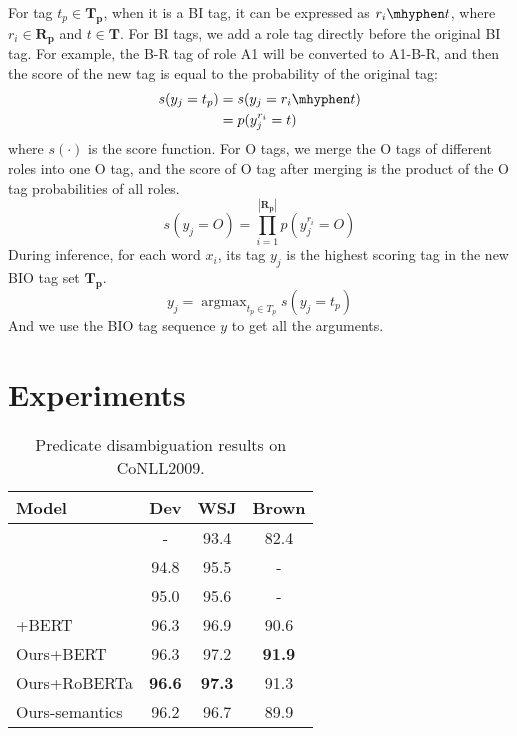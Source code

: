 \documentclass[11pt]{article}
\begin{document}
For tag $t_p \in \bm{T_p}$, when it is a BI tag, it can be expressed as $r_i\mhyphen t$, where $r_i \in \bm{R_p}$ and $t \in \bm{T}$. For BI tags, we add a role tag directly before the original BI tag. For example, the B-R tag of role A1 will be converted to A1-B-R, and then the score of the new tag is equal to the probability of the original tag:
\begin{equation}
\begin{aligned}
    s(y_j=t_p)&=s(y_j=r_i\mhyphen t) \\
    &=p(y^{r_i}_j=t)
\end{aligned}   
\end{equation}
where $s(\cdot)$ is the score function. For O tags, we merge the O tags of different roles into one O tag, and the score of O tag after merging is the product of the O tag probabilities of all roles. 
\begin{equation}
 s(y_j=O)= \prod_{i=1}^{|\bm{R_p}|} p(y^{r_i}_j=O)    
\end{equation}
During inference, for each word $x_i$, its tag $y_j$ is the highest scoring tag in the new BIO tag set $\bm{T_p}$.
\begin{equation}
y_j = \mathop{\arg\max}_{t_p \in T_p} s(y_j=t_p) 
\end{equation}
And we use the BIO tag sequence $y$ to get all the arguments.
\section{Experiments}
\begin{table}
\centering
\small 
\begin{tabular}{lccc} 
\toprule
Model                    & Dev   & WSJ   & Brown  \\ 
\midrule
\citet{shi2017joint} & -     & 93.4 & 82.4  \\
\citet{roth-lapata-2016-neural}     & 94.8 & 95.5 & -      \\
\citet{he-etal-2018-syntax} & 95.0 & 95.6 & -      \\
\citet{shi2019simple}{\scriptsize+BERT} & 96.3 & 96.9 & 90.6  \\ 
\midrule
Ours{\scriptsize+BERT}   &   96.3  &  97.2  & \textbf{91.9} \\
Ours{\scriptsize+RoBERTa}  & \textbf{96.6} & \textbf{97.3} & 91.3 \\
Ours{\scriptsize -semantics} &  96.2  & 96.7 & 89.9 \\
\bottomrule
\end{tabular}
\caption{Predicate disambiguation results on CoNLL2009.}
\label{disam}
\end{table}
\end{document}
